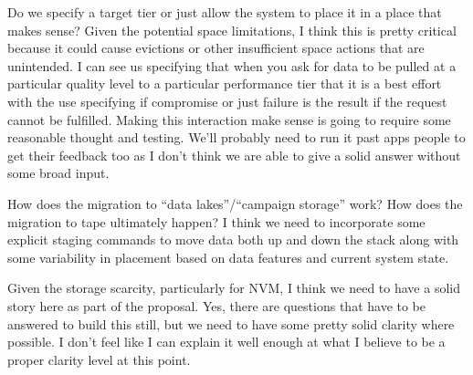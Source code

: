 Do we specify a target tier or just allow the system to place it in a place
that makes sense? Given the potential space limitations, I think this is
pretty critical because it could cause evictions or other insufficient space
actions that are unintended. I can see us specifying that when you ask for
data to be pulled at a particular quality level to a particular performance
tier that it is a best effort with the use specifying if compromise or just
failure is the result if the request cannot be fulfilled. Making this
interaction make sense is going to require some reasonable thought and
testing. We'll probably need to run it past apps people to get their
feedback too as I don't think we are able to give a solid answer without
some broad input.

How does the migration to ``data lakes''/``campaign storage'' work? How does
the migration to tape ultimately happen? I think we need to incorporate some
explicit staging commands to move data both up and down the stack along with
some variability in placement based on data features and current system
state.

Given the storage scarcity, particularly for NVM, I think we need to have a
solid story here as part of the proposal. Yes, there are questions that have
to be answered to build this still, but we need to have some pretty solid
clarity where possible. I don't feel like I can explain it well enough at
what I believe to be a proper clarity level at this point.

